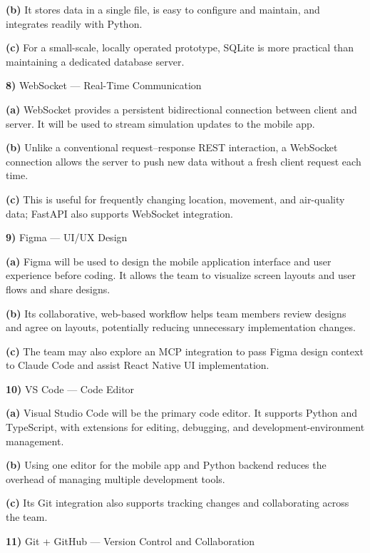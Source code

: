 \documentclass[conference]{IEEEtran}
\begin{document}
\par\noindent\textbf{(b)} It stores data in a single file, is easy to configure and maintain, and integrates readily with Python.
\par\noindent\textbf{(c)} For a small-scale, locally operated prototype, SQLite is more practical than maintaining a dedicated database server.
\par\noindent\textbf{8)} WebSocket --- Real-Time Communication
\par\noindent\textbf{(a)} WebSocket provides a persistent bidirectional connection between client and server. It will be used to stream simulation updates to the mobile app.
\par\noindent\textbf{(b)} Unlike a conventional request--response REST interaction, a WebSocket connection allows the server to push new data without a fresh client request each time.
\par\noindent\textbf{(c)} This is useful for frequently changing location, movement, and air-quality data; FastAPI also supports WebSocket integration.
\par\noindent\textbf{9)} Figma --- UI/UX Design
\par\noindent\textbf{(a)} Figma will be used to design the mobile application interface and user experience before coding. It allows the team to visualize screen layouts and user flows and share designs.
\par\noindent\textbf{(b)} Its collaborative, web-based workflow helps team members review designs and agree on layouts, potentially reducing unnecessary implementation changes.
\par\noindent\textbf{(c)} The team may also explore an MCP integration to pass Figma design context to Claude Code and assist React Native UI implementation.
\par\noindent\textbf{10)} VS Code --- Code Editor
\par\noindent\textbf{(a)} Visual Studio Code will be the primary code editor. It supports Python and TypeScript, with extensions for editing, debugging, and development-environment management.
\par\noindent\textbf{(b)} Using one editor for the mobile app and Python backend reduces the overhead of managing multiple development tools.
\par\noindent\textbf{(c)} Its Git integration also supports tracking changes and collaborating across the team.
\par\noindent\textbf{11)} Git + GitHub --- Version Control and Collaboration
\end{document}
